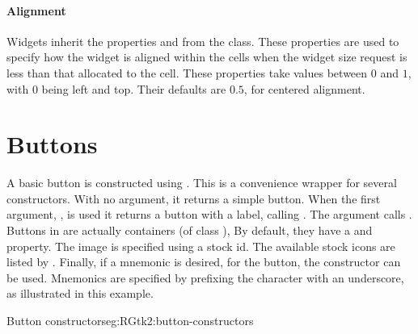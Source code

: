 \paragraph{Alignment}
Widgets inherit the properties  and  from
the  class. These properties are used to specify how
the widget is aligned within the cells when the widget size request is
less than that allocated to the cell. These properties take values between $0$ and
$1$, with $0$ being left and top. Their defaults are $0.5$, for centered alignment.








\section{Buttons}
\label{sec:RGtk2:gtkButton}

A basic button is constructed using . This is a
convenience wrapper for several constructors. With no argument, it
returns a simple button. When the first argument, , is
used it returns a button with a label, calling
. The  argument
calls .  Buttons in \GTK\/ are
actually containers (of class ), By default, they have a
 and  property. The image is specified using a
stock id. The available stock icons are listed by
. Finally, if a mnemonic is desired, for the
button, the constructor  can be
used. Mnemonics are specified by prefixing the character with an
underscore, as illustrated in this example.

\begin{example}{Button constructors}{eg:RGtk2:button-constructors}
\begin{Schunk}
\end{Schunk}
\end{example}

